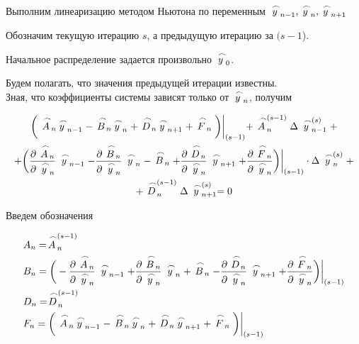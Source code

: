 \documentclass[a4paper, 14pt]{article}
\begin{document}
Выполним линеаризацию методом Ньютона по переменным $\buildrel\,\,\frown\over{y}_{n-1}, \buildrel\,\,\frown\over{y}_n, \buildrel\,\,\frown\over{y}_{n+1}$

Обозначим текущую итерацию $s$, а предыдущую итерацию за $(s-1$).  

Начальное распределение задается произвольно $\buildrel\,\,\frown\over{y}_0$. 

Будем полагать, что значения предыдущей итерации известны.\\

Зная, что коэффициенты системы зависят только от $\buildrel\,\,\frown\over{y}_n$, получим

\begin{multline*}
\bigg(\buildrel\,\,\frown\over{A}_n\buildrel\,\,\frown\over{y}_{n-1}-\buildrel\,\,\frown\over{B}_n\buildrel\,\,\frown\over{y}_n+\buildrel\,\,\frown\over{D}_n\buildrel\,\,\frown\over{y}_{n+1}+\buildrel\,\,\frown\over{F}_n\bigg)\bigg|_{(s-1)}+\buildrel\,\,\frown\over{A}_n^{(s-1)}\Delta\buildrel\,\,\frown\over{y}_{n-1}^{(s)}+\\
+\bigg(\frac{\partial \buildrel\,\,\frown\over{A}_n}{\partial\buildrel\,\,\frown\over{y}_n}\buildrel\,\,\frown\over{y}_{n-1}-\frac{\partial \buildrel\,\,\frown\over{B}_n}{\partial\buildrel\,\,\frown\over{y}_n}\buildrel\,\,\frown\over{y}_{n}-\buildrel\,\,\frown\over{B}_n+\frac{\partial \buildrel\,\,\frown\over{D}_n}{\partial\buildrel\,\,\frown\over{y}_n}\buildrel\,\,\frown\over{y}_{n+1}+\frac{\partial \buildrel\,\,\frown\over{F}_n}{\partial\buildrel\,\,\frown\over{y}_n}\bigg)\bigg|_{(s-1)}\cdot
\Delta\buildrel\,\,\frown\over{y}_{n}^{(s)}+ \\
+\buildrel\,\,\frown\over{D}_n^{(s-1)}\Delta\buildrel\,\,\frown\over{y}_{n+1}^{(s)}=0
\end{multline*}

\newpage
Введем обозначения 

\begin{equation*}
\begin{aligned}
&A_n=\buildrel\,\,\frown\over{A}_n^{(s-1)}\\
&B_n=\bigg(-\frac{\partial \buildrel\,\,\frown\over{A}_n}{\partial\buildrel\,\,\frown\over{y}_n}\buildrel\,\,\frown\over{y}_{n-1}+\frac{\partial \buildrel\,\,\frown\over{B}_n}{\partial\buildrel\,\,\frown\over{y}_n}\buildrel\,\,\frown\over{y}_{n}+\buildrel\,\,\frown\over{B}_n-\frac{\partial \buildrel\,\,\frown\over{D}_n}{\partial\buildrel\,\,\frown\over{y}_n}\buildrel\,\,\frown\over{y}_{n+1}+\frac{\partial \buildrel\,\,\frown\over{F}_n}{\partial\buildrel\,\,\frown\over{y}_n}\bigg)\bigg|_{(s-1)}\\
&D_n=\buildrel\,\,\frown\over{D}_n^{(s-1)}\\
&F_n=\bigg(\buildrel\,\,\frown\over{A}_n\buildrel\,\,\frown\over{y}_{n-1}-\buildrel\,\,\frown\over{B}_n\buildrel\,\,\frown\over{y}_n+\buildrel\,\,\frown\over{D}_n\buildrel\,\,\frown\over{y}_{n+1}+\buildrel\,\,\frown\over{F}_n\bigg)\bigg|_{(s-1)}
\end{aligned}
\end{equation*}
\end{document}

